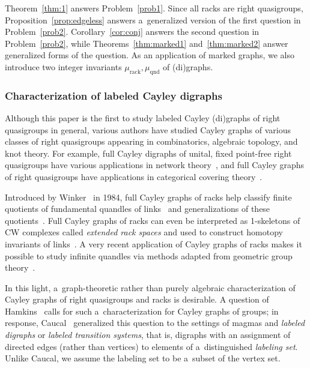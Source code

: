 \documentclass{jonasart}
\begin{document}
	Theorem~\ref{thm:1} answers Problem~\ref{prob1}. Since all racks are right quasigroups, Proposition~\ref{prop:edgeless} answers a~generalized version of the first question in Problem~\ref{prob2}. Corollary~\ref{cor:conj} answers the second question in Problem~\ref{prob2}, while Theorems~\ref{thm:marked1} and~\ref{thm:marked2} answer generalized forms of the question. As an application of marked graphs, we also introduce two integer invariants $\mu_{\mathrm{rack}},\mu_{\mathrm{qnd}}$ of (di)graphs.

	\subsubsection{Characterization of labeled Cayley digraphs}
    
	Although this paper is the first to study labeled Cayley (di)graphs of right quasigroups in general, various authors have studied Cayley graphs of various classes of right quasigroups appearing in combinatorics, algebraic topology, and knot theory. For example, full Cayley digraphs of unital, fixed point-free right quasigroups have various applications in network theory~\cite{groupoid1}, and full Cayley graphs of right quasigroups have applications in categorical covering theory~\cite{categories}.

	Introduced by Winker~\cite{winker} in 1984, full Cayley graphs of racks help classify finite quotients of fundamental quandles of links~\cite{link3, link2} and generalizations of these quotients~\cite{link1}. Full Cayley graphs of racks can even be interpreted as 1-skeletons of CW complexes called \emph{extended rack spaces} and used to construct homotopy invariants of links~\cite{homology}. A very recent application of Cayley graphs of racks makes it possible to study infinite quandles via methods adapted from geometric group theory~\cite{metrics}.

	In this light, a~graph-theoretic rather than purely algebraic characterization of Cayley graphs of right quasigroups and racks is desirable. A question of Hamkins~\cite{hamkins} calls for such a~characterization for Cayley graphs of groups; in response, Caucal~\cite{caucal, caucal2} generalized this question to the settings of magmas and \emph{labeled digraphs} or \emph{labeled transition systems}, that is, digraphs with an assignment of directed edges (rather than vertices) to elements of a~distinguished \emph{labeling set}. Unlike Caucal, we assume the labeling set to be a~subset of the vertex set.
    
\end{document}
